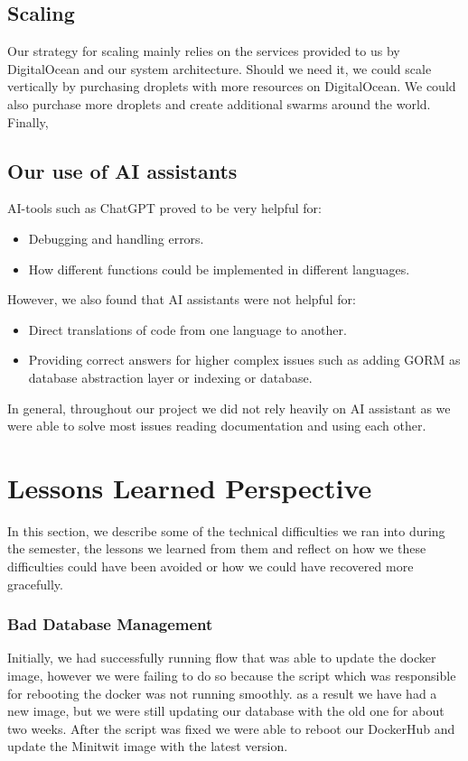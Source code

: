 \documentclass{article}
\begin{document}
\subsection{Scaling}
Our strategy for scaling mainly relies on the services provided to us by DigitalOcean and our system architecture. Should we need it, we could scale vertically by purchasing droplets with more resources on DigitalOcean. We could also purchase more droplets and create additional swarms around the world. Finally, 

\subsection{Our use of AI assistants}
AI-tools such as ChatGPT proved to be very helpful for:
\begin{itemize}
    \item Debugging and handling errors.
    \item How different functions could be implemented in different languages.
\end{itemize}
However, we also found that AI assistants were not helpful for:
\begin{itemize}
    \item Direct translations of code from one language to another.
    \item Providing correct answers for higher complex issues such as adding GORM as database abstraction layer or indexing or database.
\end{itemize}

In general, throughout our project we did not rely heavily on AI assistant as we were able to solve most issues reading documentation and using each other.

\section{Lessons Learned Perspective}
In this section, we describe some of the technical difficulties we ran into during the semester, the lessons we learned from them and reflect on how we these difficulties could have been avoided or how we could have recovered more gracefully.

\subsubsection{Bad Database Management}
Initially, we had successfully running flow that was able to update the docker image, however we were failing to do so because the script which was responsible for rebooting the docker was not running smoothly. as a result we have had a new image, but we were still updating our database with the old one for about two weeks. 
After the script was fixed we were able to reboot our DockerHub and update the Minitwit image with the latest version.
\end{document}

